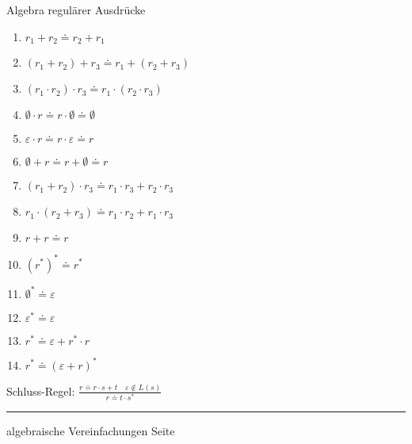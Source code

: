 \documentclass{slides}
\newcommand{\bruch}[2]{\frac{\displaystyle#1}{\displaystyle #2}}
\newcounter{mypage}
\begin{document}
\begin{slide}{}
\normalsize
\begin{center}
Algebra regul\"arer Ausdr\"ucke
\end{center}
\vspace{0.5cm}

\footnotesize

\begin{enumerate}
\item $r_1 + r_2 \doteq r_2 + r_1$
\item $(r_1 + r_2) + r_3 \doteq r_1 + (r_2 + r_3)$
\item $(r_1 \cdot r_2) \cdot r_3 \doteq r_1 \cdot (r_2 \cdot r_3)$
\item $\emptyset \cdot r \doteq r \cdot \emptyset \doteq \emptyset$
\item $\varepsilon \cdot r \doteq r \cdot \varepsilon \doteq r$
\item $\emptyset + r \doteq r + \emptyset \doteq r$
\item $(r_1 + r_2) \cdot r_3 \doteq r_1 \cdot r_3 + r_2 \cdot r_3$
\item $r_1 \cdot (r_2 + r_3) \doteq r_1 \cdot r_2 + r_1 \cdot r_3$
\item $r + r \doteq r$
\item $(r^*)^* \doteq r^*$      
\item $\emptyset^* \doteq \varepsilon$
\item $\varepsilon^* \doteq \varepsilon$
\item $r^* \doteq \varepsilon + r^* \cdot r$
\item $r^* \doteq (\varepsilon + r)^*$
\end{enumerate}
Schluss-Regel:\quad
$\bruch{r \doteq r \cdot s + t \quad \varepsilon \not\in L(s)}{r \doteq t \cdot s^*}$


\vspace*{\fill}
\tiny \addtocounter{mypage}{1}
\rule{17cm}{1mm}
algebraische Vereinfachungen  \hspace*{\fill} Seite 
\end{slide}


\end{document}
